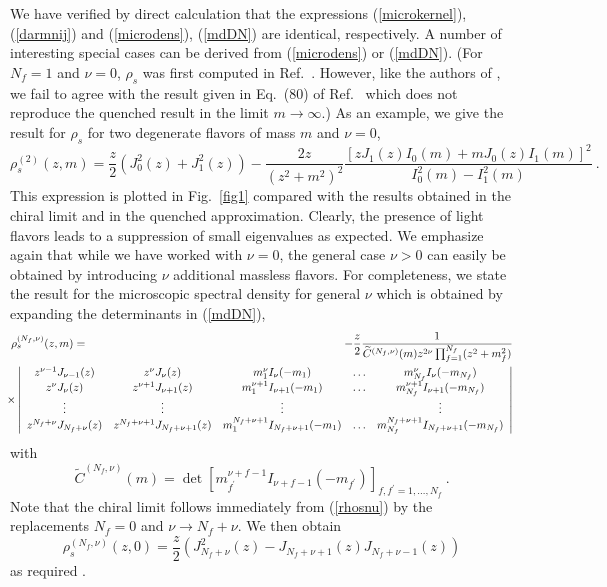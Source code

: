 We have verified by direct calculation that the expressions
(\ref{microkernel}), (\ref{darmnij}) and (\ref{microdens}),
(\ref{mdDN}) are identical, respectively.  A number of interesting
special cases can be derived from (\ref{microdens}) or (\ref{mdDN}).
(For $N_f=1$ and $\nu=0$, $\rho_s$ was first computed in
Ref.~\cite{Jurk96}.  However, like the authors of \cite{Damg97}, we
fail to agree with the result given in Eq.~(80) of Ref.~\cite{Jurk96}
which does not reproduce the quenched result in the limit
$m\to\infty$.)  As an example, we give the result for $\rho_s$ for two
degenerate flavors of mass $m$ and $\nu=0$,
\begin{equation}
  \rho_s^{(2)}(z,m)=\frac{z}{2}\left(J_0^2(z)+J_1^2(z)\right)
  -\frac{2z}{(z^2+m^2)^2}\frac{[zJ_1(z)I_0(m)+mJ_0(z)I_1(m)]^2}
  {I_0^2(m)-I_1^2(m)}\:.
\end{equation}
This expression is plotted in Fig.~\ref{fig1} compared with the
results obtained in the chiral limit and in the quenched
approximation.  
Clearly, the presence of light flavors leads to a suppression of small
eigenvalues as expected.  We emphasize again that while we have worked
with $\nu=0$, the general case $\nu>0$ can easily be obtained by
introducing $\nu$ additional massless flavors. For completeness, we
state the result for the microscopic spectral density for general
$\nu$ which is obtained by expanding the determinants in (\ref{mdDN}),
\begin{eqnarray}
\rho_s^{(N_f,\nu)}(z,m) & = &  
  -\frac{z}{2}
  \frac{1}{\widetilde{C}^{(N_f,\nu)}(m)z^{2\nu}
    \prod_{f=1}^{N_f}(z^2+m_f^2)}  \nonumber \\ 
  & & \hspace*{-80pt} \times
\left|\begin{array}{ccccc}
  z^{\nu-1}J_{\nu-1}(z) & z^\nu J_\nu(z) & m_1^\nu I_\nu(-m_1) & 
  \ldots & m_{N_f}^\nu I_\nu(-m_{N_f}) \\
  z^\nu J_\nu(z) & z^{\nu+1} J_{\nu+1}(z) & 
  m_1^{\nu+1}I_{\nu+1}(-m_1) & \ldots & 
  m_{N_f}^{\nu+1}I_{\nu+1}(-m_{N_f}) \\
  \vdots & \vdots & \vdots & & \vdots \\
  z^{N_f+\nu} J_{N_f+\nu}(z) & 
  z^{N_f+\nu+1} J_{N_f+\nu+1}(z) & 
  m_1^{N_f+\nu+1}I_{N_f+\nu+1}(-m_1) & \ldots & 
  m_{N_f}^{N_f+\nu+1}I_{N_f+\nu+1}(-m_{N_f}) 
\end{array}\right|
\label{rhosnu}
\end{eqnarray}
with
\begin{equation}
  \widetilde{C}^{(N_f,\nu)}(m)=
  \det\left[m_{f^\prime}^{\nu+f-1}I_{\nu+f-1}(-m_{f^\prime}) 
        \right]_{f,f^\prime=1,\ldots,N_f}\:.
\end{equation}
Note that the chiral limit follows immediately from (\ref{rhosnu}) by
the replacements $N_f=0$ and $\nu\to N_f+\nu$.   We then obtain
\begin{equation}
  \rho_s^{(N_f,\nu)}(z,0)=\frac{z}{2}\left(J_{N_f+\nu}^2(z)
    -J_{N_f+\nu+1}(z)J_{N_f+\nu-1}(z)\right)
\end{equation}
as required \cite{Verb93}.


